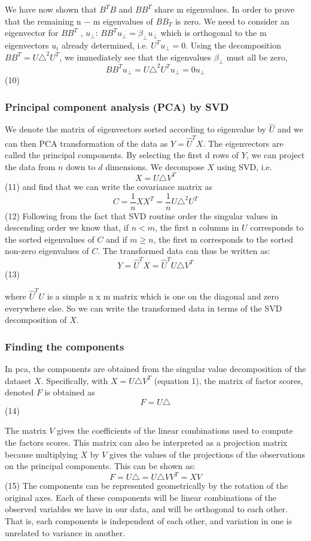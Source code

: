 \documentclass[12pt,twoside]{article}
\begin{document}
\bigbreak
We have now shown that $B^{T}B$ and $BB^{T}$ share m eigenvalues.
\bigbreak
In order to prove that the remaining n − m eigenvalues of $BB_{T}$ is zero. We need to consider an eigenvector for  $BB^{T}$ , $u_{\perp}$: $BB^{T} u_{\perp} = \beta_{\perp} u_{\perp}$ which is orthogonal to the m eigenvectors $u_{i}$ already determined, i.e. $U^{T} u_{\perp} = 0$. Using the decomposition $BB^{T} = U\triangle^2U^{T}$, we immediately see that the eigenvalues $\beta_{\perp}$ must all be zero,
$$BB^{T} u_{\perp} = U\triangle^2U^{T} u_{\perp} = 0 u_{\perp}$$ \hfill (10)
\bigbreak
\subsubsection*{Principal component analysis (PCA) by SVD}
\bigbreak
We denote the matrix of eigenvectors sorted according to eigenvalue by $\hat{U}$ and we can then PCA transformation of the data as $Y = \hat{U}^{T}X$. The eigenvectors are called the principal components. By selecting the first d rows of $Y$, we can project the data from $n$ down to $d$ dimensions.
\bigbreak
We decompose $X$ using SVD, i.e.
$$X = U\triangle V^{T}$$ \hfill (11)\newline
and find that we can write the covariance matrix as
$$C = \frac{1}{n} XX^{T} = \frac{1}{n} U\triangle^2U^{T}$$ \hfill (12)
\bigbreak
Following from the fact that SVD routine order the singular values in descending order we know that, if $n < m$, the first n columns in $U$ corresponds to the sorted eigenvalues of $C$ and if $m \geq n$, the first m corresponds to the sorted non-zero eigenvalues of $C$. The transformed data can thus be written as:
$$Y = \hat{U}^{T}X = \hat{U}^{T}U\triangle V^T$$ \hfill (13)

where $\hat{U}^{T}U$ is a simple n x m matrix which is one on the diagonal and zero everywhere else. So we can write the transformed data in terms of the SVD decomposition of $X$. 


\subsubsection*{Finding the components}

In pca, the components are obtained from the singular value decomposition of the dataset $X$.  Specifically, with $X = U\triangle V^{T}$ (equation 1), the matrix of factor scores, denoted $F$ is obtained as
$$ F = U\triangle$$ \hfill (14)

The matrix $V$ gives the coefficients of the linear combinations used to compute the factors scores. This matrix can also be interpreted as a projection matrix because multiplying $X$ by $V$ gives the values of the projections of the observations on the principal components. This can be shown as:
$$ F = U\triangle = U\triangle VV^{T}  = XV$$ \hfill (15) 
\bigbreak
The components can be represented geometrically by the rotation of the original axes. Each of these components will be linear combinations of the observed variables we have in our data, and will be orthogonal to each other. That is, each components is independent of each other, and variation in one is unrelated to variance in another. 
\end{document}
